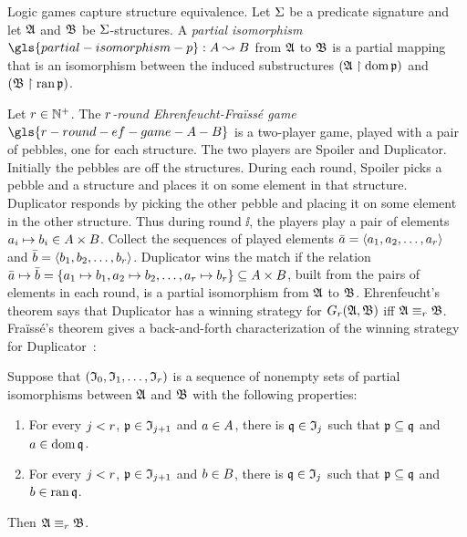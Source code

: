 Logic games capture structure equivalence.
Let $\mathrm{\Sigma}$ be a predicate signature and let $\mathfrak{A}$ and $\mathfrak{B}$ be
$\mathrm{\Sigma}$-structures.
A \emph{partial isomorphism} $\gls{partial-isomorphism-p} : \domA \pto \domB$
from $\mathfrak{A}$ to $\mathfrak{B}$ is a partial mapping that is an isomorphism between the 
induced substructures $(\mathfrak{A} \restriction \operatorname{dom} \mathfrak{p})$ and 
$(\mathfrak{B} \restriction \operatorname{ran} \mathfrak{p})$.

Let $r \in \mathbb{N}^{+}$.
The \emph{$r$-round Ehrenfeucht-Fra\"{i}ss\'{e} game}
$\gls{r-round-ef-game-A-B}$ is a two-player game, played with a pair of pebbles,
one for each structure. The two players are Spoiler and Duplicator.
Initially the pebbles are off the structures.
During each round, Spoiler picks a pebble and a structure
and places it on some element in that structure.
Duplicator responds by picking the other pebble and placing it on some
element in the other structure. Thus during round $\ii$, the players play a pair
of elements $a_{i} \mapsto b_{i} \in A \times B$. 
Collect the sequences of played elements $\bar{a} = \left\langle a_{1}, a_{2}, \dots,
a_{r} \right\rangle$ and $\bar{b} = \left\langle b_{1}, b_{2}, \dots, b_{r} \right\rangle$.
Duplicator wins the match if the
relation $\bar{a} \mapsto \bar{b} = \left\{a_{1} \mapsto b_{1}, a_{2} \mapsto
b_{2}, \dots, a_{r} \mapsto b_{r}\right\} \subseteq A \times B$, built from
the pairs of elements in each round, is a partial isomorphism from $\mathfrak{A}$ to
$\mathfrak{B}$.
Ehrenfeucht's theorem says that Duplicator has a winning strategy for
$G_{r}(\mathfrak{A},\mathfrak{B})$ iff $\mathfrak{A} \equiv_{r} \mathfrak{B}$.
Fra\"{i}ss\'{e}'s theorem gives a back-and-forth characterization of the winning
strategy for Duplicator~\cite[ch. 2]{ebbinghaus1999finite}:
\begin{theorem}\label{thm:game-ef}
Suppose that $(\mathfrak{I}_{0}, \mathfrak{I}_{1}, \dots, \mathfrak{I}_{r})$ is a sequence of nonempty
sets of partial isomorphisms between $\mathfrak{A}$ and $\mathfrak{B}$ with the following
properties:
\begin{enumerate}
  \item For every $j < r$, $\mathfrak{p} \in \mathfrak{I}_{j+1}$ and $a \in A$,
  there is $\mathfrak{q} \in \mathfrak{I}_{j}$ such that $\mathfrak{p} \subseteq \mathfrak{q}$ and
  $a \in \operatorname{dom}\mathfrak{q}$.
  \item For every $j < r$, $\mathfrak{p} \in \mathfrak{I}_{j+1}$ and $b \in B$,
  there is $\mathfrak{q} \in \mathfrak{I}_{j}$ such that $\mathfrak{p} \subseteq \mathfrak{q}$ and 
  $b \in \operatorname{ran}\mathfrak{q}$.
\end{enumerate}
Then $\mathfrak{A} \equiv_{r} \mathfrak{B}$.
\end{theorem}
